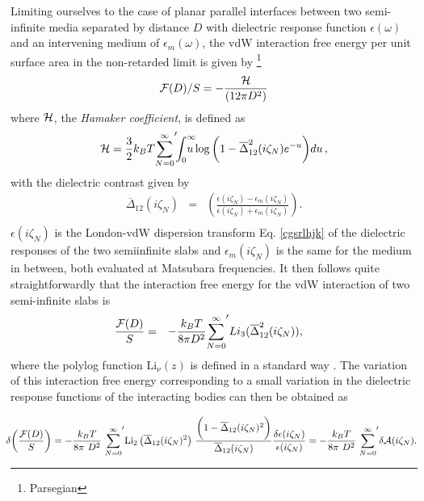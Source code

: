 \documentclass[letterpaper,twocolumn,amsmath,amssymb,floatfix,aps,superscriptaddress]{revtex4}
\begin{document}
Limiting ourselves to the case of planar parallel interfaces between two semi-infinite media separated by distance $D$ with dielectric response function $\epsilon(\omega)$ and an intervening medium of $\epsilon_m(\omega)$, the vdW interaction free energy per unit surface area in the non-retarded limit is given by \footnote{Parsegian} 
$${{\cal F}(D)}/{S} =  - \frac{{\cal H}}{(12\pi D^2)} %
\label{cfbr}$$ where ${\cal H}$, the {\em Hamaker coefficient}, is defined as
\begin{equation}
{\cal H} = \frac32 k_BT {\sum_{N=0}^{\infty}}'\!\! \int_0^{\infty} \!\!\! \!\!\! u \log\bigg( 1 - \overline\Delta_{12}^2(i \zeta_N) e^{-u}\bigg) du\,,
\label{vdxahj}
\end{equation}
with the dielectric contrast given by
\begin{eqnarray}
 \overline\Delta_{12}(i \zeta_N) &=& \left( \frac{\epsilon(i \zeta_N) - \epsilon_m(i \zeta_N)}{\epsilon(i \zeta_N) + \epsilon_m(i \zeta_N)}\right). \nonumber\\
~
\end{eqnarray}
$\epsilon(i \zeta_N)$ is the London-vdW dispersion transform Eq. \ref{cgsrlhjk} of the dielectric responses of the two semiinfinite slabs and $\epsilon_m(i \zeta_N)$ is the same for the medium in between, both evaluated at Matsubara frequencies. It then follows quite straightforwardly that the interaction free energy for the vdW interaction of two semi-infinite slabs is  
\begin{eqnarray}
\kern-10pt \frac{{\cal F}(D)}{S} &=&  - \frac{k_BT }{8\pi D^2} {\sum_{N=0}^{\infty}}'  Li_3(\overline\Delta_{12}^2(i \zeta_N) ),
\label{cfbr1}
\end{eqnarray}
where the polylog function $\text{Li}_{\nu}(z)$ is defined in a standard way \cite{Abramowitz}. The variation of this interaction free energy corresponding to a small variation in the dielectric response functions of the interacting bodies can then be obtained as
\begin{widetext}
\begin{equation}
\kern-5pt \delta \bigg(\frac{{\cal F}(D)}{S}\bigg) = - \frac{k_BT}{8\pi ~D^2} ~{\sum_{N=0}^{\infty}}'  {\text{Li}_2\left(\overline\Delta_{12}(i \zeta_N) ^2\right)}~ \frac{\bigg( 1 - \overline\Delta_{12}(i \zeta_N)^2 \bigg)}{\overline\Delta_{12}(i \zeta_N)}  \frac{\delta \epsilon(i \zeta_N)}{\epsilon(i \zeta_N)} = - \frac{k_BT}{8\pi ~D^2} ~{\sum_{N=0}^{\infty}}'  \delta{\cal A}(i\zeta_N).
\label{ncirselunh}
\end{equation}
\end{widetext}
\end{document}

